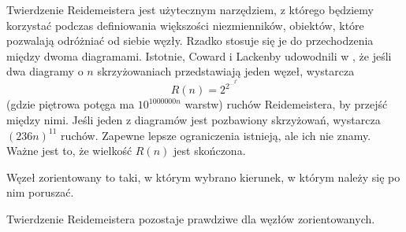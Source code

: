 Twierdzenie Reidemeistera jest użytecznym narzędziem,
z którego będziemy korzystać podczas definiowania większości niezmienników,
obiektów, które pozwalają odróżniać od siebie węzły.
Rzadko stosuje się je do przechodzenia między dwoma diagramami.
Istotnie, Coward i Lackenby udowodnili w \cite{coward11},
że jeśli dwa diagramy o $n$ skrzyżowaniach przedstawiają jeden węzeł, wystarcza
\[
    R(n) = 2^{2^{\ldots^{2^n}}}
\]
(gdzie piętrowa potęga ma $10^{1000000n}$ warstw) ruchów Reidemeistera, by przejść między nimi.
Jeśli jeden z diagramów jest pozbawiony skrzyżowań, wystarcza $(236n)^{11}$ ruchów.
Zapewne lepsze ograniczenia istnieją, ale ich nie znamy.
Ważne jest to, że wielkość $R(n)$ jest skończona.

\begin{definition}
    Węzeł zorientowany to taki, w którym wybrano kierunek, w którym należy się po nim poruszać.
\end{definition}

Twierdzenie Reidemeistera pozostaje prawdziwe dla węzłów zorientowanych.

